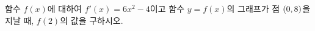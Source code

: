 함수 $f(x)$에 대하여 $f'(x)=6x^2-4$이고 함수 $y=f(x)$의 그래프가 점 $(0{,}\mkern3mu\mathopen{}8)$을 지날 때, $f(2)$의 값을 구하시오.
